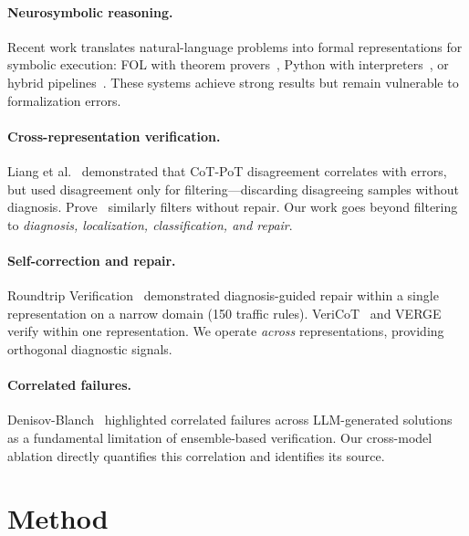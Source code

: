 \documentclass[11pt,a4paper]{article}
\begin{document}
\paragraph{Neurosymbolic reasoning.}
Recent work translates natural-language problems into formal representations for symbolic execution: FOL with theorem provers~\cite{pan2023logic,ye2024satlm}, Python with interpreters~\cite{chen2023pot,gao2023pal}, or hybrid pipelines~\cite{hybridmind2025}. These systems achieve strong results but remain vulnerable to formalization errors.

\paragraph{Cross-representation verification.}
Liang et al.~\citeyear{liang2024cotpot} demonstrated that CoT-PoT disagreement correlates with errors, but used disagreement only for filtering---discarding disagreeing samples without diagnosis. Prove~\citeyear{prove2024} similarly filters without repair. Our work goes beyond filtering to \emph{diagnosis, localization, classification, and repair}.

\paragraph{Self-correction and repair.}
Roundtrip Verification~\cite{roundtrip2026} demonstrated diagnosis-guided repair within a single representation on a narrow domain (150 traffic rules). VeriCoT~\cite{vericot2025} and VERGE~\cite{verge2025} verify within one representation. We operate \emph{across} representations, providing orthogonal diagnostic signals.

\paragraph{Correlated failures.}
Denisov-Blanch~\citeyear{denisovblanch2026} highlighted correlated failures across LLM-generated solutions as a fundamental limitation of ensemble-based verification. Our cross-model ablation directly quantifies this correlation and identifies its source.

\section{Method}
\label{sec:method}
\end{document}
